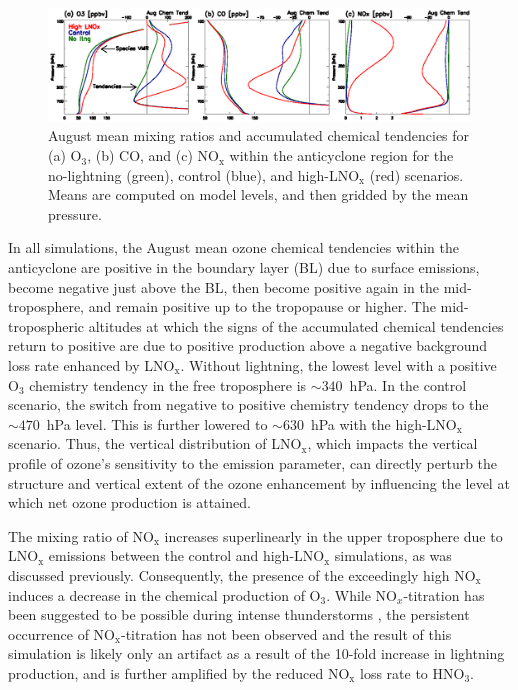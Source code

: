  \begin{figure}
 \noindent\includegraphics[width=40pc]{Figures/ltngsens_vert.eps}
 \caption[August mean mixing ratios and chemical tendencies]{\small
August mean mixing ratios and accumulated chemical tendencies
for (a) O$_3$, (b) CO, and (c) NO$_{\mathrm{x}}$ within the anticyclone
region for the no-lightning (green), control (blue),
and high-LNO$_{\mathrm{x}}$ (red) scenarios. Means are computed on model levels, and then
gridded by the mean pressure.}
 \label{fig:ltng_vert}
 \end{figure}

In all simulations, the August mean ozone chemical tendencies within the anticyclone
are positive in the boundary layer (BL) due to surface emissions, become negative just above
the BL, then become positive again in the mid-troposphere, and remain
positive up to the tropopause or higher. The mid-tropospheric altitudes at which the signs of the
accumulated chemical tendencies return to positive are due to positive production above a negative
background loss rate enhanced by LNO$_\mathrm{x}$. Without lightning, the
lowest level with a positive O$_3$ chemistry tendency in the free troposphere is $\sim340$~hPa.
In the control scenario, the switch from negative to positive chemistry tendency
drops to the $\sim470$~hPa level. This is further lowered to $\sim630$~hPa with the
high-LNO$_\mathrm{x}$ scenario. Thus, the vertical distribution of LNO$_\mathrm{x}$,
which impacts the vertical profile of ozone's sensitivity to the emission parameter,
can directly perturb the structure and vertical extent of the ozone enhancement
by influencing the level at which net ozone production is attained.

The mixing ratio of NO$_\mathrm{x}$ increases superlinearly in the upper troposphere due to
LNO$_\mathrm{x}$ emissions between the control and high-$\mathrm{LNO_x}$
simulations, as was discussed previously. Consequently, the presence of the exceedingly
high NO$_\mathrm{x}$ induces a decrease in the chemical production of
O$_3$. While NO$_x$-titration has been suggested to be possible during intense
thunderstorms \citep[e.g][]{Cummings:2013vn}, the persistent occurrence
of NO$_\mathrm{x}$-titration has not been observed and the result of this simulation is likely only an
artifact as a result of the 10-fold increase in lightning production, and is
further amplified by the reduced NO$_{\mathrm{x}}$ loss rate to HNO$_3$.

